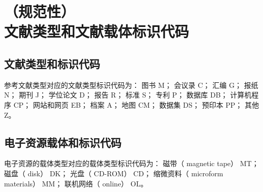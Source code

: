 \documentclass[twoside]{article}%
\begin{document}
\newpage
\section[文献类型和文献载体标识代码]{（规范性）\\文献类型和文献载体标识代码}

\subsection{文献类型和标识代码}

参考文献类型对应的文献类型标识代码为：
图书 M；
会议录 C；
汇编 G；
报纸 N；
期刊 J；
学位论文 D；
报告 R；
标准 S；
专利 P；
数据库 DB；
计算机程序 CP；
网站和网页 EB；
档案 A；
地图 CM；
数据集 DS；
预印本 PP；
其他 Z。

\subsection{电子资源载体和标识代码}


电子资源的载体类型对应的载体类型标识代码为：
磁带（ magnetic tape） MT；
磁盘（ disk） DK；
光盘（ CD-ROM） CD；
缩微资料（ microform materials） MM；
联机网络（ online） OL。
\end{document}
